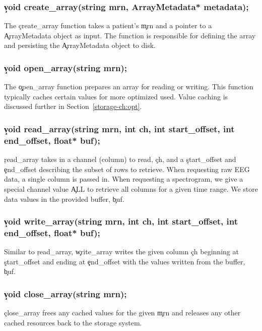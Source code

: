 \subsubsection{\c{void create\_array(string mrn, ArrayMetadata* metadata);}}

The \c{create\_array} function takes a patient's \c{mrn} and a pointer to a
\c{ArrayMetadata} object as input. The function is responsible for defining the
array and persisting the \c{ArrayMetadata} object to disk.

\subsubsection{\c{void open\_array(string mrn);}}

The \c{open\_array} function prepares an array for reading or writing. This
function typically caches certain values for more optimized used. Value caching is
discussed further in Section~\ref{storage-ch:opt}.

\subsubsection{\c{void read\_array(string mrn, int ch, int start\_offset, int end\_offset, float* buf);}}

\c{read\_array} takes in a channel (column) to read, \c{ch}, and a
\c{start\_offset} and \c{end\_offset} describing the subset of rows to
retrieve. When requesting raw EEG data, a single column is passed in. When
requesting a spectrogram, we give a special channel value \c{ALL} to retrieve
all columns for a given time range. We store data values in the provided
buffer, \c{buf}.

\subsubsection{\c{void write\_array(string mrn, int ch, int start\_offset, int end\_offset, float* buf);}}

Similar to \c{read\_array}, \c{write\_array} writes the given column \c{ch}
beginning at \c{start\_offset} and ending at \c{end\_offset} with the values
written from the buffer, \c{buf}.

\subsubsection{\c{void close\_array(string mrn);}}

\c{close\_array} frees any cached values for the given \c{mrn} and releases any
other cached resources back to the storage system.

